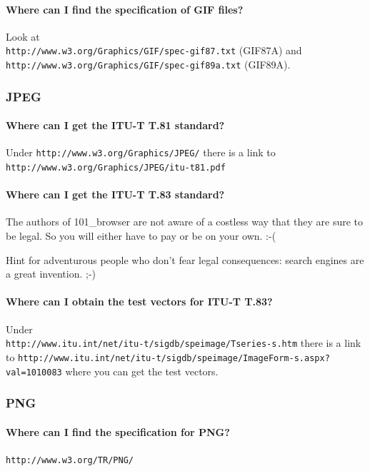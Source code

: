 \documentclass[10pt]{scrbook}
\begin{document}
\paragraph{Where can I find the specification of GIF files?}
Look at \\
\verb|http://www.w3.org/Graphics/GIF/spec-gif87.txt| (GIF87A) and \\
\verb|http://www.w3.org/Graphics/GIF/spec-gif89a.txt| (GIF89A).

\subsubsection{JPEG}

\paragraph{Where can I get the ITU-T T.81 standard?} Under \verb|http://www.w3.org/Graphics/JPEG/| there is a link to \verb|http://www.w3.org/Graphics/JPEG/itu-t81.pdf|

\paragraph{Where can I get the ITU-T T.83 standard?} The authors of 101\_browser are not aware of a costless way that they are sure to be legal. So you will either have to pay or be on your own. :-(

Hint for adventurous people who don't fear legal consequences: search engines are a great invention. ;-)

\paragraph{Where can I obtain the test vectors for ITU-T T.83?} Under \\
\verb|http://www.itu.int/net/itu-t/sigdb/speimage/Tseries-s.htm|
there is a link to
\verb|http://www.itu.int/net/itu-t/sigdb/speimage/ImageForm-s.aspx?val=1010083|
where you can get the test vectors.

\subsubsection{PNG}

\paragraph{Where can I find the specification for PNG?} \verb|http://www.w3.org/TR/PNG/|
\end{document}
